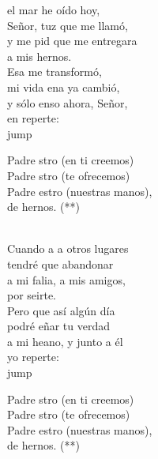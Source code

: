 \begin{cancion}%
	el mar he oído hoy,\\
	Señor, tuz que me llamó,\\
	y me pid que me entregara \\
	a mis hernos.\\
	Esa  me transformó,\\
	mi vida ena ya cambió,\\
	y sólo enso ahora, Señor,\\
	en reperte:\\jump\\
	\begin{chorus}%
	Padre stro (en ti creemos)\\
	Padre stro (te ofrecemos)\\
	Padre estro (nuestras manos),\\
	de hernos. (**)\\
	\end{chorus}%
	\jump\\
	Cuando a a otros lugares\\
	tendré que abandonar\\
	a mi falia, a mis amigos,\\
	por seirte.\\
	Pero  que así algún día\\
	podré eñar tu verdad\\
	a mi heano, y junto a él\\
	yo reperte:\\jump\\
	\begin{chorus}%
	Padre stro (en ti creemos)\\
	Padre stro (te ofrecemos)\\
	Padre estro (nuestras manos),\\
	de hernos. (**)\\
	\end{chorus}%
	\jump\\
\end{cancion}%
